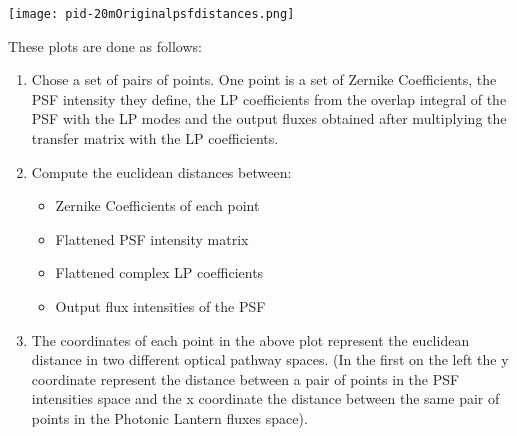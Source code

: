 		\begin{figure*}[ht!]
			\centering
			\texttt{[image: pid-20mOriginalpsfdistances.png]}
		\end{figure*}
		\FloatBarrier
		
		These plots are done as follows:
		\begin{enumerate}
			\item Chose a set of pairs of points. One point is a set of Zernike Coefficients, the PSF intensity they define, the LP coefficients from the overlap integral of the PSF with the LP modes and the output fluxes obtained after multiplying the transfer matrix with the LP coefficients.
			\item Compute the euclidean distances between:
				\begin{itemize}
					\item Zernike Coefficients of each point
					\item Flattened PSF intensity matrix
					\item Flattened complex LP coefficients
					\item Output flux intensities of the PSF
				\end{itemize}
			\item The coordinates of each point in the above plot represent the euclidean distance in two different optical pathway spaces. (In the first on the left the y coordinate represent the distance between a pair of points in the PSF intensities space and the x coordinate the distance between the same pair of points in the Photonic Lantern fluxes space).
		\end{enumerate}
		